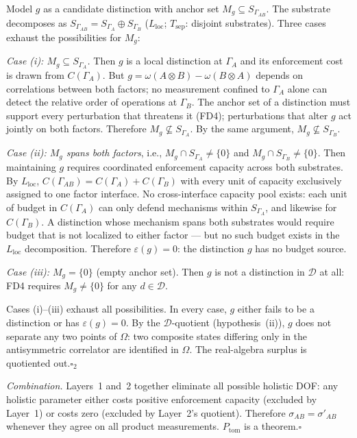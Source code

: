 \documentclass[11pt]{article}
\theoremstyle{remark}
\begin{document}
\begin{tcolorbox}[apfbox, title={$P_{\mathrm{tom}}$: Local Tomographic Closure}]
Model $g$ as a candidate distinction with anchor set $M_g \subseteq S_{\Gamma_{AB}}$.  The substrate decomposes as $S_{\Gamma_{AB}} = S_{\Gamma_A} \oplus S_{\Gamma_B}$ ($L_{\mathrm{loc}}$; $T_{\mathrm{sep}}$: disjoint substrates).  Three cases exhaust the possibilities for $M_g$:

\textit{Case (i): $M_g \subseteq S_{\Gamma_A}$.}  Then $g$ is a local distinction at $\Gamma_A$ and its enforcement cost is drawn from $C(\Gamma_A)$.  But $g = \omega(A \otimes B) - \omega(B \otimes A)$ depends on correlations between both factors; no measurement confined to $\Gamma_A$ alone can detect the relative order of operations at $\Gamma_B$.  The anchor set of a distinction must support every perturbation that threatens it (FD4); perturbations that alter $g$ act jointly on both factors.  Therefore $M_g \not\subseteq S_{\Gamma_A}$.  By the same argument, $M_g \not\subseteq S_{\Gamma_B}$.

\textit{Case (ii): $M_g$ spans both factors}, i.e., $M_g \cap S_{\Gamma_A} \ne \{0\}$ and $M_g \cap S_{\Gamma_B} \ne \{0\}$.  Then maintaining $g$ requires coordinated enforcement capacity across both substrates.  By $L_{\mathrm{loc}}$, $C(\Gamma_{AB}) = C(\Gamma_A) + C(\Gamma_B)$ with every unit of capacity exclusively assigned to one factor interface.  No cross-interface capacity pool exists: each unit of budget in $C(\Gamma_A)$ can only defend mechanisms within $S_{\Gamma_A}$, and likewise for $C(\Gamma_B)$.  A distinction whose mechanism spans both substrates would require budget that is not localized to either factor --- but no such budget exists in the $L_{\mathrm{loc}}$ decomposition.  Therefore $\varepsilon(g) = 0$: the distinction $g$ has no budget source.

\textit{Case (iii): $M_g = \{0\}$} (empty anchor set).  Then $g$ is not a distinction in $\mathcal{D}$ at all: FD4 requires $M_g \ne \{0\}$ for any $d \in \mathcal{D}$.

Cases (i)--(iii) exhaust all possibilities.  In every case, $g$ either fails to be a distinction or has $\varepsilon(g) = 0$.  By the $\mathcal{D}$-quotient (hypothesis~(ii)), $g$ does not separate any two points of $\Omega$: two composite states differing only in the antisymmetric correlator are identified in $\Omega$.  The real-algebra surplus is quotiented out.\hfill$\square_2$

\textit{Combination.}  Layers~1 and~2 together eliminate all possible holistic DOF: any holistic parameter either costs positive enforcement capacity (excluded by Layer~1) or costs zero (excluded by Layer~2's quotient).  Therefore $\sigma_{AB} = \sigma'_{AB}$ whenever they agree on all product measurements.  $P_{\mathrm{tom}}$ is a theorem.\hfill$\square$


\end{tcolorbox}
\end{document}
